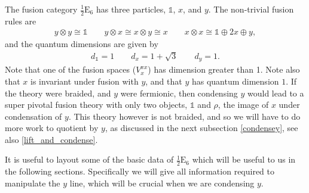 \documentclass[12pt,a4paper]{article}
\newcommand{\tp}{\otimes}
\newcommand{\halfesix}{\frac{1}{2}\text{E}_6}
\begin{document}
The fusion category $\halfesix$ has three particles, $\mathds{1}$, $x$, and $y$. 
The non-trivial fusion rules are
\begin{align}
y \tp y \cong \mathds{1} \quad \quad y \tp x \cong x \tp y \cong x \quad \quad x\tp x \cong \mathds{1}\oplus 2x \oplus y,
\label{halfEsixFusionRules}
\end{align}
and the quantum dimensions are given by
\begin{align}
d_{\mathds{1}} = 1 \quad \quad d_x = 1 + \sqrt{3} \quad \quad d_y = 1.
\end{align}
Note that one of the fusion spaces ($V_x^{xx}$) has dimension greater than 1.
Note also that $x$ 
is invariant under fusion with $y$, and that $y$ has quantum dimension $1$. 
If the theory were braided, and $y$ were fermionic, then condensing $y$ would lead to a super pivotal fusion theory with only two objects, $\mathds{1}$ and $\rho$, the image of $x$ under condensation of $y$. 
This theory however is not braided, and so we will have to do more work to quotient by $y$, as discussed in the next subsection \ref{condensey}, see also \ref{lift_and_condense}.

It is useful to layout some of the basic data of $\halfesix$ which will be useful to us in the following sections. 
Specifically we will give all information required to manipulate the $y$ line, which will be crucial when we are condensing $y$. 
\end{document}
